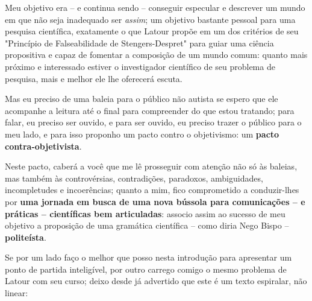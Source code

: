 Meu objetivo era -- e continua sendo -- conseguir especular e descrever um mundo em que não seja inadequado ser \textit{assim};
    um objetivo bastante pessoal para uma pesquisa científica, exatamente o que Latour propõe em um dos critérios de seu "Princípio de Falseabilidade de Stengers-Despret" para guiar uma ciência propositiva e capaz de fomentar a composição de um mundo comum:
        quanto mais próximo e interessado estiver o investigador científico de seu problema de pesquisa, mais e melhor ele lhe oferecerá escuta.

Mas eu preciso de uma baleia para o público não autista se espero que ele acompanhe a leitura até o final para compreender do que estou tratando;
    para falar, eu preciso ser ouvido, e para ser ouvido, eu preciso trazer o público para o meu lado, e para isso proponho um pacto contro o objetivismo:
        um \textbf{pacto contra-objetivista}.

Neste pacto, caberá a você que me lê prosseguir com atenção não só às baleias, mas também às controvérsias, contradições, paradoxos, ambiguidades, incompletudes e incoerências;
    quanto a mim, fico comprometido a conduzir-lhes por \textbf{uma jornada em busca de uma nova bússola para comunicações -- e práticas -- científicas bem articuladas}:
        associo assim ao sucesso de meu objetivo a proposição de uma gramática científica -- como diria Nego Bispo -- \textbf{politeísta}.

Se por um lado faço o melhor que posso nesta introdução para apresentar um ponto de partida inteligível, por outro carrego comigo o mesmo problema de Latour com seu curso;
    deixo desde já advertido que este é um texto espiralar, não linear: